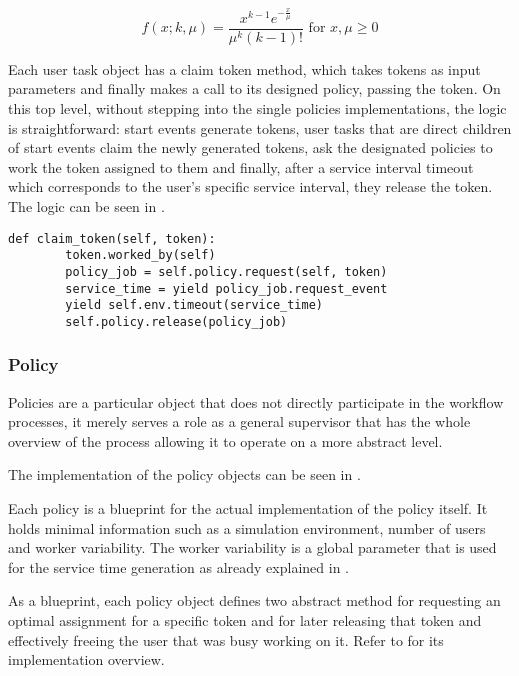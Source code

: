 \documentclass{seal_thesis}
\begin{document}
\begin{equation}
\label{eq:erlang_density}
	f(x;k,\mu) = \frac{x^{k-1} e^{-\frac{x}{\mu}}}{\mu^k (k-1)!} \text{ for } x,\mu \geq 0
\end{equation}

Each user task object has a claim token method, which takes tokens as input parameters and finally makes a call to its designed policy, passing the token. On this top level, without stepping into the single policies implementations, the logic is straightforward: start events generate tokens, user tasks that are direct children of start events claim the newly generated tokens, ask the designated policies to work the token assigned to them and finally, after a service interval timeout which corresponds to the user's specific service interval, they release the token. The logic can be seen in .

\begin{lstlisting}[caption=User task claim method,label=lst:user_task,style=CustomPython]
    def claim_token(self, token):
        token.worked_by(self)
        policy_job = self.policy.request(self, token)
        service_time = yield policy_job.request_event
        yield self.env.timeout(service_time)
        self.policy.release(policy_job)
\end{lstlisting}

\subsubsection{Policy}

Policies are a particular object that does not directly participate in the workflow processes, it merely serves a role as a general supervisor that has the whole overview of the process allowing it to operate on a more abstract level. 

The implementation of the policy objects can be seen in .


Each policy is a blueprint for the actual implementation of the policy itself. It holds minimal information such as a simulation environment, number of users and worker variability. The worker variability is a global parameter that is used for the service time generation as already explained in .

As a blueprint, each policy object defines two abstract method for requesting an optimal assignment for a specific token and for later releasing that token and effectively freeing the user that was busy working on it. Refer to  for its implementation overview.
\end{document}

